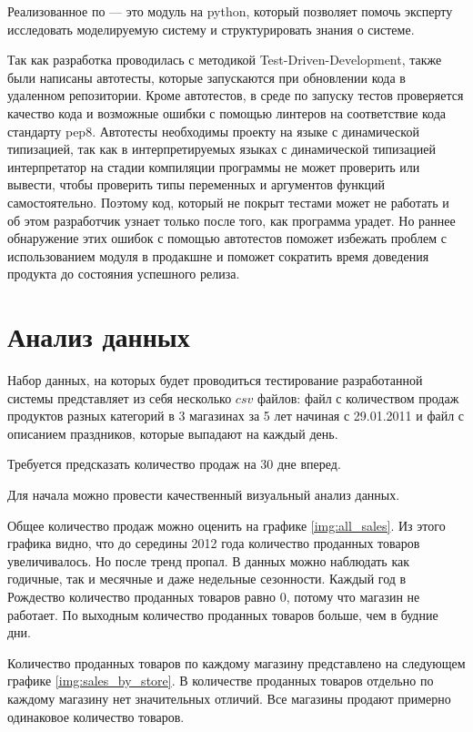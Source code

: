 Реализованное по --- это модуль на python, который позволяет помочь эксперту
исследовать моделируемую систему и структурировать знания о системе.

Так как разработка проводилась с методикой Test-Driven-Development,
также были написаны автотесты, которые запускаются
при обновлении кода в удаленном репозитории. Кроме автотестов,
в среде по запуску тестов проверяется качество кода и возможные ошибки
с помощью линтеров на соответствие кода стандарту pep8.
Автотесты необходимы проекту на языке с динамической типизацией,
так как в интерпретируемых языках с динамической типизацией
интерпретатор на стадии компиляции программы не может проверить или вывести, чтобы проверить
типы переменных и аргументов функций самостоятельно. Поэтому код, который
не покрыт тестами может не работать и об этом разработчик узнает
только после того, как программа урадет. Но раннее обнаружение этих
ошибок с помощью автотестов поможет избежать проблем с использованием модуля в
продакшне и поможет сократить время доведения продукта до состояния успешного релиза.

\section{Анализ данных}

Набор данных, на которых будет проводиться тестирование разработанной системы
представляет из себя несколько $ csv $ файлов: файл с количеством продаж
продуктов разных категорий в 3 магазинах за 5 лет начиная с 29.01.2011
и файл с описанием праздников, которые выпадают на каждый день.

Требуется предсказать количество продаж на 30 дне вперед.

Для начала можно провести качественный визуальный анализ данных.

Общее количество продаж можно оценить на графике \ref{img:all_sales}.
Из этого графика видно, что до середины 2012 года количество проданных
товаров увеличивалось. Но после тренд пропал. В данных можно наблюдать
как годичные, так и месячные и даже недельные сезонности. Каждый год
в Рождество количество проданных товаров равно 0, потому что магазин не работает.
По выходным количество проданных товаров больше, чем в будние дни.

Количество проданных товаров по каждому магазину представлено на следующем графике \ref{img:sales_by_store}.
В количестве проданных товаров отдельно по каждому магазину нет значительных отличий.
Все магазины продают примерно одинаковое количество товаров.

